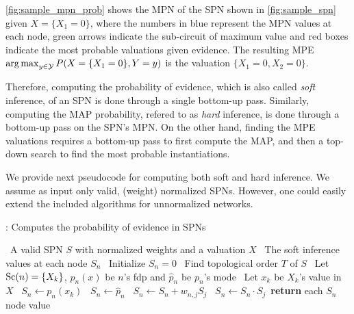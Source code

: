 \autoref{fig:sample_mpn_prob} shows the MPN of the SPN shown in \autoref{fig:sample_spn} given
$X=\{X_1=0\}$, where the numbers in blue represent the MPN values at each node, green arrows
indicate the sub-circuit of maximum value and red boxes indicate the most probable valuations given
evidence. The resulting MPE $\operatorname*{arg\,max}_{y\in\mathcal{Y}} P(X=\{X_1=0\},Y=y)$ is the valuation
$\{X_1=0, X_2=0\}$.

Therefore, computing the probability of evidence, which is also called \textit{soft} inference, of
an SPN is done through a single bottom-up pass. Similarly, computing the MAP probability, refered
to as \textit{hard} inference, is done through a bottom-up pass on the SPN's MPN\@.  On the other
hand, finding the MPE valuations requires a bottom-up pass to first compute the MAP, and then a
top-down search to find the most probable instantiations.

We provide next pseudocode for computing both soft and hard inference. We assume as input only
valid, (weight) normalized SPNs. However, one could easily extend the included algorithms for
unnormalized networks.

\begin{algorithm}[H]
  \caption{: Computes the probability of evidence in SPNs}
  \begin{algorithmic}[1]
    \Require\, A valid SPN $S$ with normalized weights and a valuation $X$
    \Ensure\, The soft inference values at each node $S_n$
    \State\, Initialize $S_n=0$
    \State\, Find topological order $T$ of $S$
        \State\, Let $\operatorname*{\text{Sc}}(n)=\{X_k\}$, $p_n(x)$ be $n$'s fdp and $\hat{p}_n$ be $p_n$'s mode
          \State\, Let $x_k$ be $X_k$'s value in $X$
          \State\, $S_n\gets p_n(x_k)$
        \Else%
          \State\, $S_n\gets\hat{p}_n$
        \EndIf%
          \State\, $S_n\gets S_n + w_{n,j}S_j$
        \EndFor%
      \Else%
          \State\, $S_n\gets S_n\cdot S_j$
        \EndFor%
      \EndIf
    \EndFor%
    \State\,\textbf{return} each $S_n$ node value
  \end{algorithmic}
\end{algorithm}

